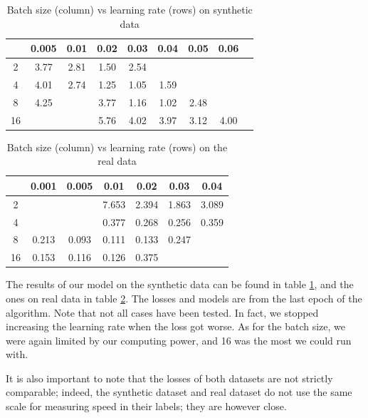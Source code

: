 \documentclass[10pt,conference]{IEEEtran}
\begin{document}
\begin{table}[h]
    \centering
    \begin{tabular}{|c || c | c | c | c | c | c| c | c |} 
        \hline
           & 0.005 & 0.01 & 0.02 & 0.03 & 0.04 & 0.05 & 0.06 \\  
        \hline\hline
        2  & 3.77  & 2.81 & 1.50 & 2.54 &      &      &\\ 
        \hline
        4  & 4.01  & 2.74 & 1.25 & 1.05 & 1.59 &      &\\
        \hline
        8  & 4.25  &      & 3.77 & 1.16 & 1.02 & 2.48 &\\
        \hline
        16 &       &      & 5.76 & 4.02 & 3.97 & 3.12 & 4.00\\
        \hline
    \end{tabular}
    \caption{Batch size (column) vs learning rate (rows) on synthetic data}
\label{table:syntheticDataResults}
\end{table}
\begin{table}[h]
    \centering
     \begin{tabular}{|c || c | c | c | c | c | c| } 
     \hline
        & 0.001& 0.005 & 0.01  & 0.02 & 0.03 & 0.04 \\  
     \hline\hline
     2  &      &       & 7.653 & 2.394& 1.863& 3.089 \\ 
     \hline
     4  &      &       & 0.377 & 0.268& 0.256& 0.359\\
     \hline
     8  & 0.213&  0.093& 0.111 & 0.133& 0.247&  \\
     \hline
     16 & 0.153&  0.116& 0.126 & 0.375&      &  \\
     \hline
    \end{tabular}
    \caption{Batch size (column) vs learning rate (rows) on the real data}
\label{table:realDataResults}
\end{table}


The results of our model on the synthetic data can be found in table \ref{table:syntheticDataResults}, and the ones on real data in table \ref{table:realDataResults}. The losses and models are from the last epoch of the algorithm. Note that not all cases have been tested. In fact, we stopped increasing the learning rate when the loss got worse. As for the batch size, we were again limited by our computing power, and 16 was the most we could run with.\par
It is also important to note that the losses of both datasets are not strictly comparable; indeed, the synthetic dataset and real dataset do not use the same scale for measuring speed in their labels; they are however close.\par
\end{document}
